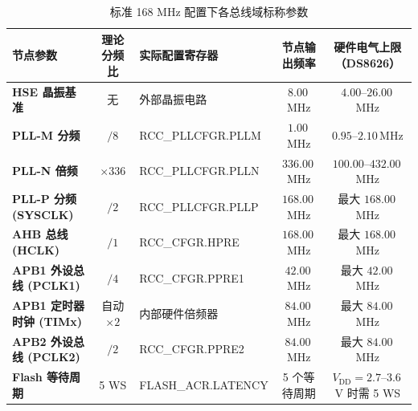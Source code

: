 \documentclass[11pt,a4paper]{ctexart}
\begin{document}
\begin{table}[H]
\centering
\caption{标准 168 MHz 配置下各总线域标称参数}
\label{tab:clk168}
\begingroup\small
\begin{tabularx}{\textwidth}{@{}>{\bfseries}p{4.1cm} c >{\footnotesize\ttfamily}p{3.9cm} c c@{}}
\toprule
\rowcolor{gray!12}
\normalfont\bfseries 节点参数 & \bfseries 理论分频比 & \bfseries 实际配置寄存器 & \bfseries 节点输出频率 & \bfseries 硬件电气上限（DS8626） \\
\midrule
HSE 晶振基准 & 无 & 外部晶振电路 & $8.00\,$MHz & $4.00$--$26.00\,$MHz \\
PLL-M 分频 & $/8$ & RCC\_PLLCFGR.PLLM & $1.00\,$MHz & $0.95$--$2.10\,$MHz \\
PLL-N 倍频 & $\times 336$ & RCC\_PLLCFGR.PLLN & $336.00\,$MHz & $100.00$--$432.00\,$MHz \\
PLL-P 分频 (SYSCLK) & $/2$ & RCC\_PLLCFGR.PLLP & $168.00\,$MHz & 最大 $168.00\,$MHz \\
AHB 总线 (HCLK) & $/1$ & RCC\_CFGR.HPRE & $168.00\,$MHz & 最大 $168.00\,$MHz \\
APB1 外设总线 (PCLK1) & $/4$ & RCC\_CFGR.PPRE1 & $42.00\,$MHz & 最大 $42.00\,$MHz \\
APB1 定时器时钟 (TIMx) & 自动 $\times 2$ & 内部硬件倍频器 & $84.00\,$MHz & 最大 $84.00\,$MHz \\
APB2 外设总线 (PCLK2) & $/2$ & RCC\_CFGR.PPRE2 & $84.00\,$MHz & 最大 $84.00\,$MHz \\
Flash 等待周期 & 5 WS & FLASH\_ACR.LATENCY & 5 个等待周期 & $V_{\mathrm{DD}}=2.7$--$3.6\,$V 时需 5 WS \\
\bottomrule
\end{tabularx}
\endgroup
\end{table}
\end{document}
